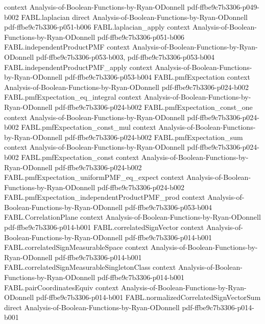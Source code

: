 \begin{theorem}
  {context}
  {Analysis-of-Boolean-Functions-by-Ryan-ODonnell}
  {pdf-ffbe9c7b3306-p049-b002}
\proofstep
  {FABL.laplacian}
  {direct}
  {Analysis-of-Boolean-Functions-by-Ryan-ODonnell}
  {pdf-ffbe9c7b3306-p051-b006}
\proofstep
  {FABL.laplacian_apply}
  {context}
  {Analysis-of-Boolean-Functions-by-Ryan-ODonnell}
  {pdf-ffbe9c7b3306-p051-b006}
\proofstep
  {FABL.independentProductPMF}
  {context}
  {Analysis-of-Boolean-Functions-by-Ryan-ODonnell}
  {pdf-ffbe9c7b3306-p053-b003,
    pdf-ffbe9c7b3306-p053-b004}
\proofstep
  {FABL.independentProductPMF_apply}
  {context}
  {Analysis-of-Boolean-Functions-by-Ryan-ODonnell}
  {pdf-ffbe9c7b3306-p053-b004}
\proofstep
  {FABL.pmfExpectation}
  {context}
  {Analysis-of-Boolean-Functions-by-Ryan-ODonnell}
  {pdf-ffbe9c7b3306-p024-b002}
\proofstep
  {FABL.pmfExpectation_eq_integral}
  {context}
  {Analysis-of-Boolean-Functions-by-Ryan-ODonnell}
  {pdf-ffbe9c7b3306-p024-b002}
\proofstep
  {FABL.pmfExpectation_const_one}
  {context}
  {Analysis-of-Boolean-Functions-by-Ryan-ODonnell}
  {pdf-ffbe9c7b3306-p024-b002}
\proofstep
  {FABL.pmfExpectation_const_mul}
  {context}
  {Analysis-of-Boolean-Functions-by-Ryan-ODonnell}
  {pdf-ffbe9c7b3306-p024-b002}
\proofstep
  {FABL.pmfExpectation_sum}
  {context}
  {Analysis-of-Boolean-Functions-by-Ryan-ODonnell}
  {pdf-ffbe9c7b3306-p024-b002}
\proofstep
  {FABL.pmfExpectation_const}
  {context}
  {Analysis-of-Boolean-Functions-by-Ryan-ODonnell}
  {pdf-ffbe9c7b3306-p024-b002}
\proofstep
  {FABL.pmfExpectation_uniformPMF_eq_expect}
  {context}
  {Analysis-of-Boolean-Functions-by-Ryan-ODonnell}
  {pdf-ffbe9c7b3306-p024-b002}
\proofstep
  {FABL.pmfExpectation_independentProductPMF_prod}
  {context}
  {Analysis-of-Boolean-Functions-by-Ryan-ODonnell}
  {pdf-ffbe9c7b3306-p053-b004}
\proofstep
  {FABL.CorrelationPlane}
  {context}
  {Analysis-of-Boolean-Functions-by-Ryan-ODonnell}
  {pdf-ffbe9c7b3306-p014-b001}
\proofstep
  {FABL.correlatedSignVector}
  {context}
  {Analysis-of-Boolean-Functions-by-Ryan-ODonnell}
  {pdf-ffbe9c7b3306-p014-b001}
\proofstep
  {FABL.correlatedSignMeasurableSpace}
  {context}
  {Analysis-of-Boolean-Functions-by-Ryan-ODonnell}
  {pdf-ffbe9c7b3306-p014-b001}
\proofstep
  {FABL.correlatedSignMeasurableSingletonClass}
  {context}
  {Analysis-of-Boolean-Functions-by-Ryan-ODonnell}
  {pdf-ffbe9c7b3306-p014-b001}
\proofstep
  {FABL.pairCoordinatesEquiv}
  {context}
  {Analysis-of-Boolean-Functions-by-Ryan-ODonnell}
  {pdf-ffbe9c7b3306-p014-b001}
\proofstep
  {FABL.normalizedCorrelatedSignVectorSum}
  {direct}
  {Analysis-of-Boolean-Functions-by-Ryan-ODonnell}
  {pdf-ffbe9c7b3306-p014-b001}

\end{theorem}
